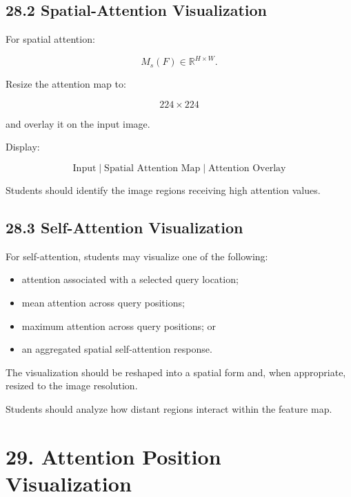 \documentclass[10pt]{article}
\begin{document}
\subsection*{28.2 Spatial-Attention Visualization}

For spatial attention:

\[
M_s(F)
\in
\mathbb{R}^{H\times W}.
\]

Resize the attention map to:

\[
224\times224
\]

and overlay it on the input image.

Display:

\[
\boxed{
\text{Input}
\;|\;
\text{Spatial Attention Map}
\;|\;
\text{Attention Overlay}
}
\]

Students should identify the image regions receiving high attention values.

\subsection*{28.3 Self-Attention Visualization}

For self-attention, students may visualize one of the following:

\begin{itemize}

\item attention associated with a selected query location;

\item mean attention across query positions;

\item maximum attention across query positions; or

\item an aggregated spatial self-attention response.

\end{itemize}

The visualization should be reshaped into a spatial form and, when
appropriate, resized to the image resolution.

Students should analyze how distant regions interact within the feature map.

\section*{29. Attention Position Visualization}
\end{document}
